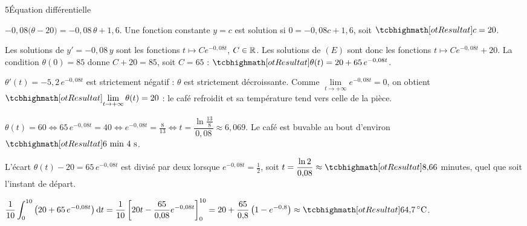 \begin{corrigeBac}{5}{Équation différentielle}
\begin{questions}
  \item $-0{,}08\big(\theta-20\big)=-0{,}08\,\theta+1{,}6$. Une fonction constante $y=c$ est solution si $0=-0{,}08c+1{,}6$, soit
    $\res{c=20}$. 
  \item Les solutions de $y'=-0{,}08\,y$ sont les fonctions $t\mapsto Ce^{-0{,}08t}$, $C\in\mathbb{R}$. Les solutions de $(E)$ sont donc les
    fonctions $t\mapsto Ce^{-0{,}08t}+20$. La condition $\theta(0)=85$ donne $C+20=85$, soit $C=65$ :
    $\res{\theta(t)=20+65\,e^{-0{,}08t}}$. 
  \item $\theta'(t)=-5{,}2\,e^{-0{,}08t}$ est strictement négatif : $\theta$ est strictement décroissante. Comme
    $\lim\limits_{t\to+\infty}e^{-0{,}08t}=0$, on obtient $\res{\lim\limits_{t\to+\infty}\theta(t)=20}$ : le café refroidit et sa
    température tend vers celle de la pièce. 
  \item $\theta(t)=60\iff65\,e^{-0{,}08t}=40\iff e^{-0{,}08t}=\frac{8}{13}\iff t=\dfrac{\ln\frac{13}{8}}{0{,}08}\approx6{,}069$. Le café
    est buvable au bout d'environ $\res{6\text{ min }4\text{ s}}$. \pts{1 pt}
  \item L'écart $\theta(t)-20=65\,e^{-0{,}08t}$ est divisé par deux lorsque $e^{-0{,}08t}=\frac12$, soit $t=\dfrac{\ln2}{0{,}08}\approx\res{8{,}66}$
    minutes, quel que soit l'instant de départ. 
  \item $\dfrac1{10}\displaystyle\int_0^{10}\left(20+65\,e^{-0{,}08t}\right)\mathrm{d}t=\dfrac1{10}\left[20t-\dfrac{65}{0{,}08}e^{-0{,}08t}\right]_0^{10}
    =20+\dfrac{65}{0{,}8}\left(1-e^{-0{,}8}\right)\approx\res{64{,}7\,^\circ\text{C}}$. \pts{1 pt}
\end{questions}
\end{corrigeBac}

